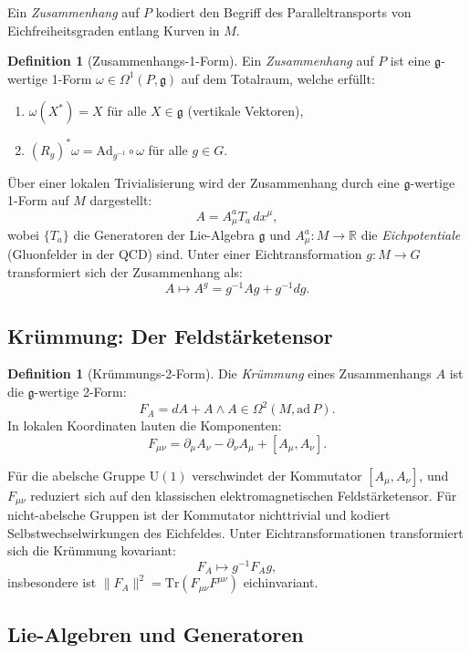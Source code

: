 \documentclass[12pt,a4paper]{amsart}
\theoremstyle{definition}
\newtheorem{definition}[theorem]{Definition}
\theoremstyle{remark}
\begin{document}
Ein \emph{Zusammenhang} auf $P$ kodiert den Begriff des Paralleltransports von
Eichfreiheitsgraden entlang Kurven in $M$.

\begin{definition}[Zusammenhangs-1-Form]
Ein \emph{Zusammenhang} auf $P$ ist eine $\mathfrak{g}$-wertige 1-Form $\omega \in
\Omega^1(P, \mathfrak{g})$ auf dem Totalraum, welche erfüllt:
\begin{enumerate}[label=(\roman*)]
  \item $\omega(X^*) = X$ für alle $X \in \mathfrak{g}$ (vertikale Vektoren),
  \item $(R_g)^* \omega = \mathrm{Ad}_{g^{-1}} \circ \omega$ für alle $g \in G$.
\end{enumerate}
\end{definition}

Über einer lokalen Trivialisierung wird der Zusammenhang durch eine
$\mathfrak{g}$-wertige 1-Form auf $M$ dargestellt:
\[
  A = A^a_\mu T_a \, dx^\mu,
\]
wobei $\{T_a\}$ die Generatoren der Lie-Algebra $\mathfrak{g}$ und
$A^a_\mu : M \to \mathbb{R}$ die \emph{Eichpotentiale} (Gluonfelder in der QCD) sind.
Unter einer Eichtransformation $g: M \to G$ transformiert sich der Zusammenhang als:
\[
  A \mapsto A^g = g^{-1} A g + g^{-1} d g.
\]

\subsection{Krümmung: Der Feldstärketensor}

\begin{definition}[Krümmungs-2-Form]
Die \emph{Krümmung} eines Zusammenhangs $A$ ist die $\mathfrak{g}$-wertige 2-Form:
\[
  F_A = dA + A \wedge A \in \Omega^2(M, \mathrm{ad}\, P).
\]
In lokalen Koordinaten lauten die Komponenten:
\[
  F_{\mu\nu} = \partial_\mu A_\nu - \partial_\nu A_\mu + [A_\mu, A_\nu].
\]
\end{definition}

Für die abelsche Gruppe $\mathrm{U}(1)$ verschwindet der Kommutator $[A_\mu, A_\nu]$,
und $F_{\mu\nu}$ reduziert sich auf den klassischen elektromagnetischen Feldstärketensor.
Für nicht-abelsche Gruppen ist der Kommutator nichttrivial und kodiert Selbstwechselwirkungen
des Eichfeldes. Unter Eichtransformationen transformiert sich die Krümmung kovariant:
\[
  F_A \mapsto g^{-1} F_A g,
\]
insbesondere ist $\|F_A\|^2 = \mathrm{Tr}(F_{\mu\nu} F^{\mu\nu})$ eichinvariant.

\subsection{Lie-Algebren und Generatoren}
\end{document}
